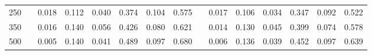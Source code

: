 % 
\begin{tabular}{ccccccccccccccc}
  \hline
  \hline
250 &  & 0.018 & 0.112 & 0.040 & 0.374 & 0.104 & 0.575 &  & 0.017 & 0.106 & 0.034 & 0.347 & 0.092 & 0.522 \\ 
  350 &  & 0.016 & 0.140 & 0.056 & 0.426 & 0.080 & 0.621 &  & 0.014 & 0.130 & 0.045 & 0.399 & 0.074 & 0.578 \\ 
  500 &  & 0.005 & 0.140 & 0.041 & 0.489 & 0.097 & 0.680 &  & 0.006 & 0.136 & 0.039 & 0.452 & 0.097 & 0.639 \\ 
   \hline
\end{tabular}
